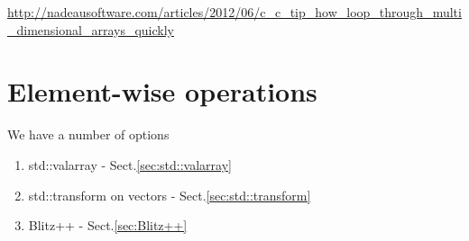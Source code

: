 \url{http://nadeausoftware.com/articles/2012/06/c_c_tip_how_loop_through_multi_dimensional_arrays_quickly}


\section{Element-wise operations}

We have a number of options
\begin{enumerate}
  \item std::valarray - Sect.\ref{sec:std::valarray}
  
  \item std::transform on vectors - Sect.\ref{sec:std::transform}
  
  \item Blitz++ - Sect.\ref{sec:Blitz++}
\end{enumerate}